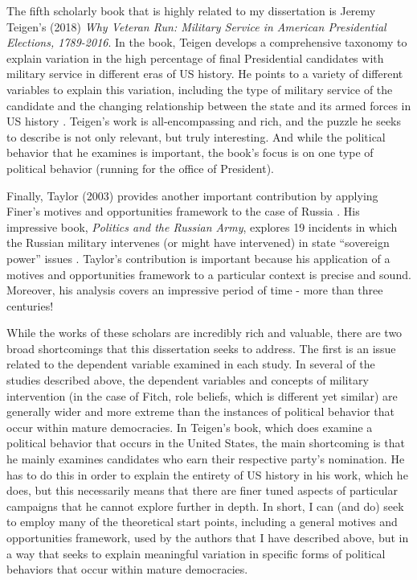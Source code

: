 \documentclass[
  12pt,
  oneside]{memoir}
\begin{document}
The fifth scholarly book that is highly related to my dissertation is Jeremy Teigen's (2018) \emph{Why Veteran Run: Military Service in American Presidential Elections, 1789-2016}. In the book, Teigen develops a comprehensive taxonomy to explain variation in the high percentage of final Presidential candidates with military service in different eras of US history. He points to a variety of different variables to explain this variation, including the type of military service of the candidate and the changing relationship between the state and its armed forces in US history \autocite{teigen_why_2018}. Teigen's work is all-encompassing and rich, and the puzzle he seeks to describe is not only relevant, but truly interesting. And while the political behavior that he examines is important, the book's focus is on one type of political behavior (running for the office of President).

Finally, Taylor (2003) provides another important contribution by applying Finer's motives and opportunities framework to the case of Russia \autocite[2]{taylor_politics_2003}. His impressive book, \emph{Politics and the Russian Army}, explores 19 incidents in which the Russian military intervenes (or might have intervened) in state ``sovereign power'' issues \autocite[3]{taylor_politics_2003}. Taylor's contribution is important because his application of a motives and opportunities framework to a particular context is precise and sound. Moreover, his analysis covers an impressive period of time - more than three centuries!

While the works of these scholars are incredibly rich and valuable, there are two broad shortcomings that this dissertation seeks to address. The first is an issue related to the dependent variable examined in each study. In several of the studies described above, the dependent variables and concepts of military intervention (in the case of Fitch, role beliefs, which is different yet similar) are generally wider and more extreme than the instances of political behavior that occur within mature democracies. In Teigen's book, which does examine a political behavior that occurs in the United States, the main shortcoming is that he mainly examines candidates who earn their respective party's nomination. He has to do this in order to explain the entirety of US history in his work, which he does, but this necessarily means that there are finer tuned aspects of particular campaigns that he cannot explore further in depth. In short, I can (and do) seek to employ many of the theoretical start points, including a general motives and opportunities framework, used by the authors that I have described above, but in a way that seeks to explain meaningful variation in specific forms of political behaviors that occur within mature democracies.
\end{document}
